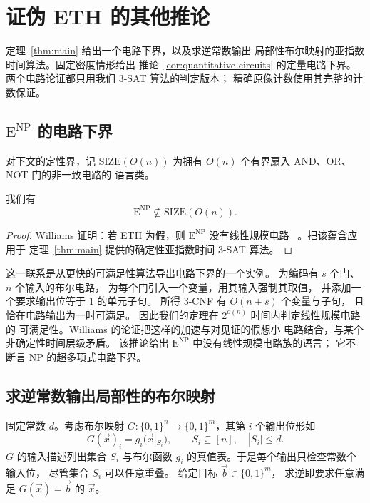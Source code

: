 \section{证伪 ETH 的其他推论}\label{app:consequences}
定理~\ref{thm:main} 给出一个电路下界，以及求逆常数输出
局部性布尔映射的亚指数时间算法。固定密度情形给出
推论~\ref{cor:quantitative-circuits} 的定量电路下界。
两个电路论证都只用我们 $3$-SAT 算法的判定版本；
精确原像计数使用其完整的计数保证。

\subsection{$\mathrm E^{\mathrm{NP}}$ 的电路下界}\label{subsec:circuit-lower-bounds}
对下文的定性界，记 $\mathrm{SIZE}(O(n))$
为拥有 $O(n)$ 个有界扇入 AND、OR、NOT 门的非一致电路的
语言类。

\begin{corollary}\label{cor:consequence-circuits}
我们有
\[
 \mathrm E^{\mathrm{NP}}\not\subseteq\mathrm{SIZE}(O(n)).
\]
\end{corollary}
\begin{proof}
Williams 证明：若 ETH 为假，则
$\mathrm E^{\mathrm{NP}}$ 没有线性规模电路
~\cite[Theorem~6.1]{Wil13}。把该蕴含应用于
定理~\ref{thm:main} 提供的确定性亚指数时间 $3$-SAT
算法。
\end{proof}

这一联系是从更快的可满足性算法导出电路下界的一个实例。
为编码有 $s$ 个门、$n$ 个输入的布尔电路，
为每个门引入一个变量，用其输入强制其取值，
并添加一个要求输出位等于 $1$ 的单元子句。
所得 $3$-CNF 有 $O(n+s)$ 个变量与子句，
且恰在电路输出为一时可满足。
因此我们的定理在 $2^{o(n)}$ 时间内判定线性规模电路的
可满足性。Williams 的论证把这样的加速与对见证的假想小
电路结合，与某个非确定性时间层级矛盾。
该推论给出 $\mathrm E^{\mathrm{NP}}$
中没有线性规模电路族的语言；
它不断言 NP 的超多项式电路下界。



\subsection{求逆常数输出局部性的布尔映射}\label{subsec:local-inversion}
固定常数 $d$。考虑布尔映射
$G:\{0,1\}^n\to\{0,1\}^m$，其第 $i$ 个输出位形如
\[
 G(\vec{x})_i=g_i(\vec{x}|_{S_i}),
 \qquad S_i\subseteq[n],\quad |S_i|\le d.
\]
$G$ 的输入描述列出集合 $S_i$ 与布尔函数 $g_i$
的真值表。于是每个输出只检查常数个输入位，
尽管集合 $S_i$ 可以任意重叠。
给定目标 $\vec{b}\in\{0,1\}^m$，
求逆即要求任意满足 $G(\vec{x})=\vec{b}$
的 $\vec{x}$。

